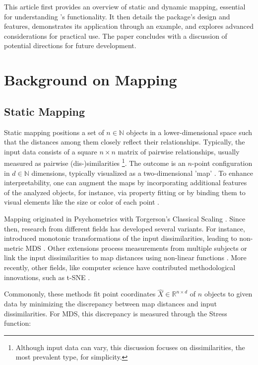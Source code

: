 \documentclass[article]{jss}
\begin{document}
This article first provides an overview of static and dynamic mapping, essential for understanding 's 
functionality. It then details the package's design and features, demonstrates its application through an example, 
and explores advanced considerations for practical use. The paper concludes with a discussion of
potential directions for future development.

\section{Background on Mapping} \label{sec:background}

\subsection{Static Mapping} \label{sec:static-mapping}

Static mapping positions a set of $n \in \mathbb{N}$ objects in a lower-dimensional space such that the distances among
 them closely reflect their relationships. Typically, the input data consists of a square $n \times n$ matrix of 
 pairwise relationships, usually measured as pairwise (dis-)similarities
\footnote{Although input data can vary, this discussion focuses on dissimilarities, the most prevalent type, for simplicity.}. 
The outcome is an $n$-point configuration in $d \in \mathbb{N}$ dimensions, typically visualized as a two-dimensional 
'map' \citep{Borg+Groenen:2005}. To enhance interpretability, one can augment the maps by incorporating additional 
features of the analyzed objects, for instance, via property fitting \citep{DeSarbo+Hoffman:1987} or by binding them to 
visual elements like the size or color of each point \citep{Ringel+Skiera:2016}.

Mapping originated in Psychometrics with Torgerson's Classical Scaling \cite{Torgerson:1958}. Since then, research from 
different fields has developed several variants. For instance, \cite{Shepard:1962a, Shepard:1962b} introduced monotonic 
transformations of the input dissimilarities, leading to non-metric MDS \citep{Kruskal:1964a, Kruskal:1964b}. Other 
extensions process measurements from multiple subjects \citep{Carroll+Chang:1970} or link the input dissimilarities to 
map distances using non-linear functions \citep{Sammon:1969}. More recently, other fields, like computer science have 
contributed methodological innovations, such as t-SNE \citep{van-der-Maaten+Hinton:2008}.

Commononly, these methods fit point coordinates $\hat{X} \in \mathbb{R}^{n \times d}$ of $n$ objects to 
given data by minimizing the discrepancy between map distances and input dissimilarities. For MDS, this 
discrepancy is measured through the Stress function:
\end{document}
